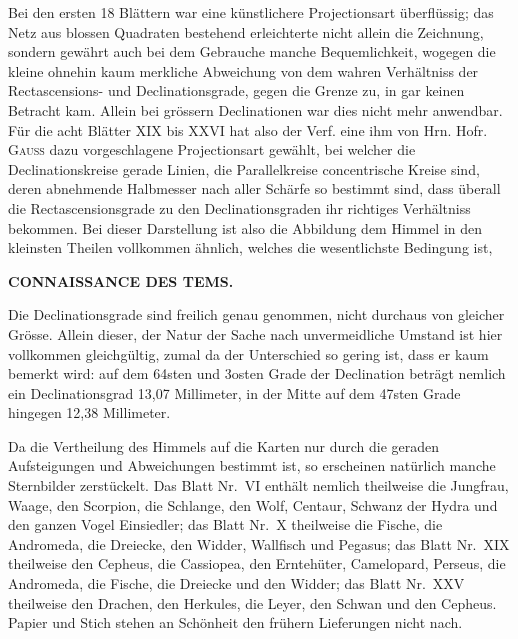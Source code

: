 Bei den ersten 18 Blättern war eine künstlichere Projectionsart überflüssig; das Netz aus blossen Quadraten bestehend erleichterte nicht allein die Zeichnung, sondern gewährt auch bei dem Gebrauche manche Bequemlichkeit, wogegen die kleine ohnehin kaum merkliche Abweichung von dem wahren Verhältniss der Rectascensions- und Declinationsgrade, gegen die Grenze zu, in gar keinen Betracht kam. Allein bei grössern Declinationen war dies nicht mehr anwendbar. Für die acht Blätter XIX bis XXVI hat also der Verf. eine ihm von Hrn. Hofr. \textsc{Gauss} dazu vorgeschlagene Projectionsart gewählt, bei welcher die Declinationskreise gerade Linien, die Parallelkreise concentrische Kreise sind, deren abnehmende Halbmesser nach aller Schärfe so bestimmt sind, dass überall die Rectascensionsgrade zu den Declinationsgraden ihr richtiges Verhältniss bekommen. Bei dieser Darstellung ist also die Abbildung dem Himmel in den kleinsten Theilen vollkommen ähnlich, welches die wesentlichste Bedingung ist,\par
\clearpage
\thispagestyle{empty}
\noindent{}%
\makebox[12mm][l]{}%
\parbox[t]{\dimexpr\linewidth-24mm\relax}{\centering\footnotesize\bfseries CONNAISSANCE DES TEMS.\par}%
\par\medskip
\noindent Die Declinationsgrade sind freilich genau genommen, nicht durchaus von gleicher Grösse. Allein dieser, der Natur der Sache nach unvermeidliche Umstand ist hier vollkommen gleichgültig, zumal da der Unterschied so gering ist, dass er kaum bemerkt wird: auf dem 64sten und 3osten Grade der Declination beträgt nemlich ein Declinationsgrad 13,07 Millimeter, in der Mitte auf dem 47sten Grade hingegen 12,38 Millimeter.

Da die Vertheilung des Himmels auf die Karten nur durch die geraden Aufsteigungen und Abweichungen bestimmt ist, so erscheinen natürlich manche Sternbilder zerstückelt. Das Blatt Nr.\ VI enthält nemlich theilweise die Jungfrau, Waage, den Scorpion, die Schlange, den Wolf, Centaur, Schwanz der Hydra und den ganzen Vogel Einsiedler; das Blatt Nr.\ X theilweise die Fische, die Andromeda, die Dreiecke, den Widder, Wallfisch und Pegasus; das Blatt Nr.\ XIX theilweise den Cepheus, die Cassiopea, den Erntehüter, Camelopard, Perseus, die Andromeda, die Fische, die Dreiecke und den Widder; das Blatt Nr.\ XXV theilweise den Drachen, den Herkules, die Leyer, den Schwan und den Cepheus. Papier und Stich stehen an Schönheit den frühern Lieferungen nicht nach.
